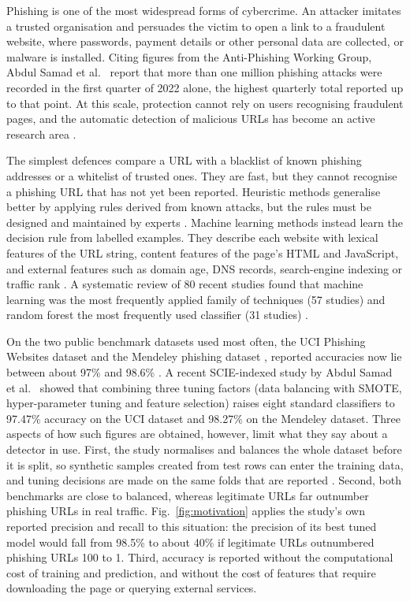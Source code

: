 \documentclass[pdflatex,sn-mathphys-num]{sn-jnl}%
\theoremstyle{thmstyleone}%
\theoremstyle{thmstyletwo}%
\theoremstyle{thmstylethree}%
\begin{document}
Phishing is one of the most widespread forms of cybercrime. An attacker imitates a trusted organisation and persuades the victim to open a link to a fraudulent website, where passwords, payment details or other personal data are collected, or malware is installed. Citing figures from the Anti-Phishing Working Group, Abdul Samad et al.\ \cite{abdulsamad2023} report that more than one million phishing attacks were recorded in the first quarter of 2022 alone, the highest quarterly total reported up to that point. At this scale, protection cannot rely on users recognising fraudulent pages, and the automatic detection of malicious URLs has become an active research area \cite{sahoo2017,tang2021,safi2023}.

The simplest defences compare a URL with a blacklist of known phishing addresses or a whitelist of trusted ones. They are fast, but they cannot recognise a phishing URL that has not yet been reported. Heuristic methods generalise better by applying rules derived from known attacks, but the rules must be designed and maintained by experts \cite{tang2021,abdulsamad2023}. Machine learning methods instead learn the decision rule from labelled examples. They describe each website with lexical features of the URL string, content features of the page's HTML and JavaScript, and external features such as domain age, DNS records, search-engine indexing or traffic rank \cite{sahoo2017,tang2021}. A systematic review of 80 recent studies found that machine learning was the most frequently applied family of techniques (57 studies) and random forest the most frequently used classifier (31 studies) \cite{safi2023}.

On the two public benchmark datasets used most often, the UCI Phishing Websites dataset \cite{mohammad2012uci} and the Mendeley phishing dataset \cite{tan2018}, reported accuracies now lie between about 97\% and 98.6\% \cite{khan2020,salihovic2019,alsarem2021,abdulsamad2023}. A recent SCIE-indexed study by Abdul Samad et al.\ \cite{abdulsamad2023} showed that combining three tuning factors (data balancing with SMOTE, hyper-parameter tuning and feature selection) raises eight standard classifiers to 97.47\% accuracy on the UCI dataset and 98.27\% on the Mendeley dataset. Three aspects of how such figures are obtained, however, limit what they say about a detector in use. First, the study normalises and balances the whole dataset before it is split, so synthetic samples created from test rows can enter the training data, and tuning decisions are made on the same folds that are reported \cite{varma2006}. Second, both benchmarks are close to balanced, whereas legitimate URLs far outnumber phishing URLs in real traffic. Fig.~\ref{fig:motivation} applies the study's own reported precision and recall to this situation: the precision of its best tuned model would fall from 98.5\% to about 40\% if legitimate URLs outnumbered phishing URLs 100 to 1. Third, accuracy is reported without the computational cost of training and prediction, and without the cost of features that require downloading the page or querying external services.
\end{document}

